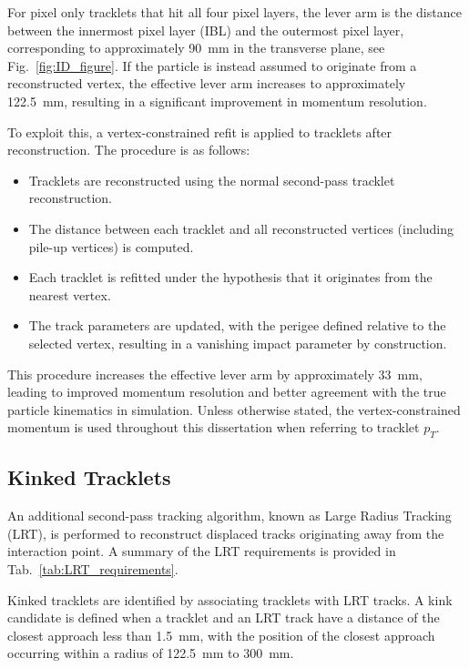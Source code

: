 For pixel only tracklets that hit all four pixel layers, the lever arm is the distance between the innermost pixel layer (IBL) and the outermost pixel layer, corresponding to approximately 90~mm in the transverse plane, see Fig.~\ref{fig:ID_figure}. If the particle is instead assumed to originate from a reconstructed vertex, the effective lever arm increases to approximately 122.5~mm, resulting in a significant improvement in momentum resolution.

To exploit this, a vertex-constrained refit is applied to tracklets after reconstruction. The procedure is as follows:
\begin{itemize}
    \item Tracklets are reconstructed using the normal second-pass tracklet reconstruction.
    \item The distance between each tracklet and all reconstructed vertices (including pile-up vertices) is computed.
    \item Each tracklet is refitted under the hypothesis that it originates from the nearest vertex.
    \item The track parameters are updated, with the perigee defined relative to the selected vertex, resulting in a vanishing impact parameter by construction.
\end{itemize}

This procedure increases the effective lever arm by approximately 33~mm, leading to improved momentum resolution and better agreement with the true particle kinematics in simulation. Unless otherwise stated, the vertex-constrained momentum is used throughout this dissertation when referring to tracklet \(p_T\).

\subsection{Kinked Tracklets}
\label{sec:kinked_tracklet}

An additional second-pass tracking algorithm, known as Large Radius Tracking (LRT), is performed to reconstruct displaced tracks originating away from the interaction point. A summary of the LRT requirements is provided in Tab.~\ref{tab:LRT_requirements}.

Kinked tracklets are identified by associating tracklets with LRT tracks. A kink candidate is defined when a tracklet and an LRT track have a distance of the closest approach less than 1.5~mm, with the position of the closest approach occurring within a radius of 122.5~mm to 300~mm.


